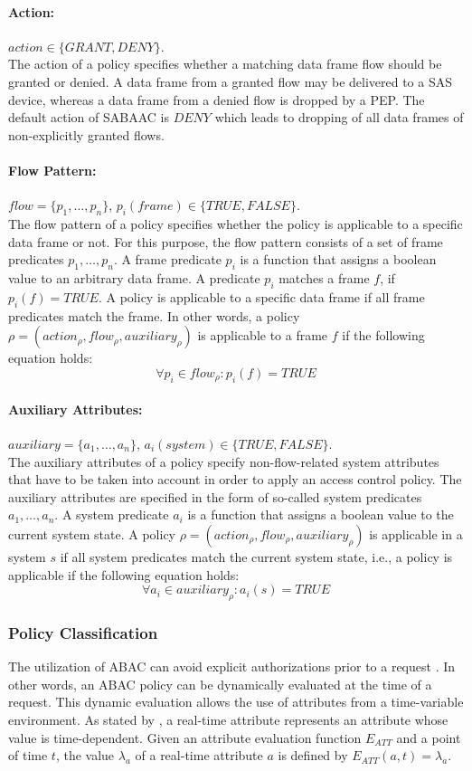 \paragraph{Action:} $action \in \{GRANT, DENY\}$.\\
The action of a policy specifies whether a matching data frame flow should be granted or denied.
A data frame from a granted flow may be delivered to a SAS device, whereas a data frame from a denied flow is dropped by a PEP.
The default action of SABAAC is $DENY$ which leads to dropping of all data frames of non-explicitly granted flows.

\paragraph{Flow Pattern:} $flow = \{p_1, \dots, p_n\}$, $p_i(frame) \in \{TRUE, FALSE\}$.\\
The flow pattern of a policy specifies whether the policy is applicable to a specific data frame or not.
For this purpose, the flow pattern consists of a set of frame predicates $p_1, \dots, p_n$.
A frame predicate $p_i$ is a function that assigns a boolean value to an arbitrary data frame.
A predicate $p_i$ matches a frame $f$, if $p_i(f) = TRUE$.
A policy is applicable to a specific data frame if all frame predicates match the frame.
In other words, a policy $\rho = (action_{\rho}, flow_{\rho}, auxiliary_{\rho})$ is applicable to a frame $f$ if the following equation holds:
\[
    \forall p_i \in flow_{\rho}: p_i(f) = TRUE
\]

\paragraph{Auxiliary Attributes:} $auxiliary = \{a_1, \dots, a_n\}$, $a_i(system) \in \{TRUE, FALSE\}$.\\
The auxiliary attributes of a policy specify non-flow-related system attributes that have to be taken into account in order to apply an access control policy.
The auxiliary attributes are specified in the form of so-called system predicates $a_1, \dots, a_n$.
A system predicate $a_i$ is a function that assigns a boolean value to the current system state.
A policy $\rho = (action_{\rho}, flow_{\rho}, auxiliary_{\rho})$ is applicable in a system $s$ if all system predicates match the current system state, i.e., a policy is applicable if the following equation holds:
\[
    \forall a_i \in auxiliary_{\rho}: a_i(s) = TRUE
\]

\subsubsection{Policy Classification}
The utilization of ABAC can avoid explicit authorizations prior to a request \cite{Hu2014}.
In other words, an ABAC policy can be dynamically evaluated at the time of a request.
This dynamic evaluation allows the use of attributes from a time-variable environment.
As stated by \citeauthor{Burmester2013} \cite{Burmester2013}, a real-time attribute represents an attribute whose value is time-dependent.
Given an attribute evaluation function $E_{ATT}$ and a point of time $t$, the value $\lambda_a$ of a real-time attribute $a$ is defined by $E_{ATT}(a, t) = \lambda_a$.

